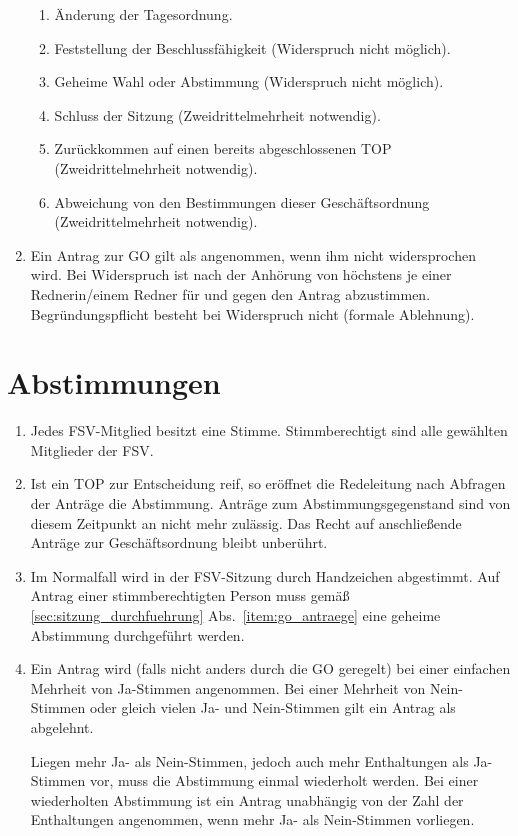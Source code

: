 \begin{enumerate}
\begin{enumerate}
		\item Änderung der Tagesordnung.
		\item Feststellung der Beschlussfähigkeit (Widerspruch nicht möglich).
		\item Geheime Wahl oder Abstimmung (Widerspruch nicht möglich).
		\item Schluss der Sitzung (Zweidrittelmehrheit notwendig).
		\item Zurückkommen auf einen bereits abgeschlossenen TOP (Zweidrittelmehrheit notwendig).
		\item Abweichung von den Bestimmungen dieser Geschäftsordnung (Zweidrittelmehrheit notwendig).
	\end{enumerate}
	\item Ein Antrag zur GO gilt als angenommen, wenn ihm nicht widersprochen wird.
	Bei Widerspruch ist nach der Anhörung von höchstens je einer Rednerin/einem Redner für und gegen den Antrag abzustimmen.
	Begründungspflicht besteht bei Widerspruch nicht (formale Ablehnung).
\end{enumerate}

\section{Abstimmungen}
\begin{enumerate}
	\item Jedes FSV-Mitglied besitzt eine Stimme.
	Stimmberechtigt sind alle gewählten Mitglieder der FSV.
	\item Ist ein TOP zur Entscheidung reif, so eröffnet die Redeleitung nach Abfragen der Anträge die Abstimmung.
	Anträge zum Abstimmungsgegenstand sind von diesem Zeitpunkt an nicht mehr zulässig.
	Das Recht auf anschließende Anträge zur Geschäftsordnung bleibt unberührt.
	\item Im Normalfall wird in der FSV-Sitzung durch Handzeichen abgestimmt.
	Auf Antrag einer stimmberechtigten Person muss gemäß \ref{sec:sitzung_durchfuehrung} Abs.~\ref{item:go_antraege} eine geheime Abstimmung durchgeführt werden.
	\item Ein Antrag wird (falls nicht anders durch die GO geregelt) bei einer einfachen Mehrheit von Ja-Stimmen angenommen.
	Bei einer Mehrheit von Nein-Stimmen oder gleich vielen Ja- und Nein-Stimmen gilt ein Antrag als abgelehnt.
	
	Liegen mehr Ja- als Nein-Stimmen, jedoch auch mehr Enthaltungen als Ja-Stimmen vor, muss die Abstimmung einmal wiederholt werden.
	Bei einer wiederholten Abstimmung ist ein Antrag unabhängig von der Zahl der Enthaltungen angenommen, wenn mehr Ja- als Nein-Stimmen vorliegen.
\end{enumerate}

